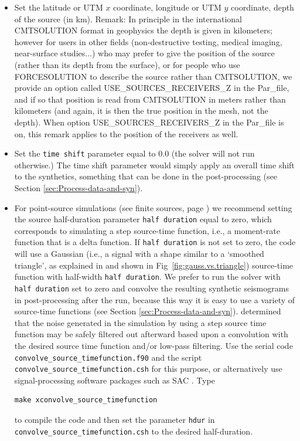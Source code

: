 \begin{itemize}
\item Set the latitude or UTM $x$ coordinate, longitude or UTM $y$ coordinate, depth of the source (in km). Remark: In principle in the international CMTSOLUTION format in geophysics
the depth is given in kilometers; however for users in other fields (non-destructive testing, medical imaging, near-surface studies...) who may prefer to give the position of the source (rather than its depth from the surface), or for people who use FORCESOLUTION to describe the source rather than CMTSOLUTION, we provide an option called USE\_SOURCES\_RECEIVERS\_Z in the Par\_file, and if so that position is read from CMTSOLUTION in meters rather than kilometers (and again, it is then the true position in the mesh, not the depth). When option USE\_SOURCES\_RECEIVERS\_Z in the Par\_file is on, this remark applies to the position of the receivers as well.
\item Set the \texttt{time shift} parameter equal to $0.0$ (the solver
will not run otherwise.) The time shift parameter would simply apply
an overall time shift to the synthetics, something that can be done
in the post-processing (see Section \ref{sec:Process-data-and-syn}).
\item For point-source simulations (see finite sources, page \pageref{To-simulate-a})
we recommend setting the source half-duration parameter \texttt{half
duration} equal to zero, which corresponds to simulating a step source-time
function, i.e., a moment-rate function that is a delta function. If
\texttt{half duration} is not set to zero, the code will use a Gaussian
(i.e., a signal with a shape similar to a `smoothed triangle', as
explained in \citet{KoTr02a} and shown in Fig~\ref{fig:gauss.vs.triangle})
source-time function with half-width \texttt{half duration}. We prefer
to run the solver with \texttt{half duration} set to zero and convolve
the resulting synthetic seismograms in post-processing after the run,
because this way it is easy to use a variety of source-time functions
(see Section \ref{sec:Process-data-and-syn}). \citet{KoTr02a} determined
that the noise generated in the simulation by using a step source
time function may be safely filtered out afterward based upon a convolution
with the desired source time function and/or low-pass filtering. Use
the serial code \texttt{convolve\_source\_timefunction.f90} and the
script \texttt{convolve\_source\_timefunction.csh} for this purpose,
or alternatively use signal-processing software packages such as SAC
. Type
{\small
\begin{verbatim}
make xconvolve_source_timefunction
\end{verbatim}
}
to compile the code and then set the parameter \texttt{hdur} in \texttt{convolve\_source\_timefunction.csh}
to the desired half-duration.


\end{itemize}
